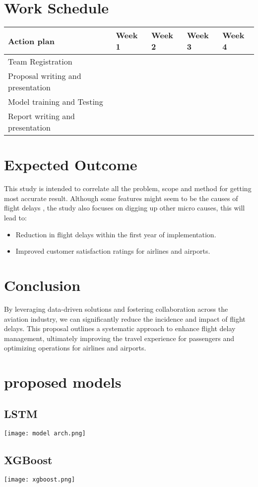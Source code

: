 \documentclass{article}
\begin{document}
\section{Work Schedule}
\begin{center}
  \begin{tabular}{|p{3cm}|p{1.5cm}|p{1.5cm}|p{1.5cm}|p{1.5cm}|}
    \hline
    \textbf{Action plan}& \textbf{Week 1} &\textbf{Week 2} &\textbf{Week 3}& \textbf{Week 4}\\[10pt]
    \hline
    Team Registration& \multicolumn{1}{c}{\cellcolor{gray}} & & & \\[10pt]
    \hline
    Proposal writing and presentation& & \multicolumn{1}{c}{\cellcolor{gray}}& &\\
    \hline
    Model training and Testing&  & & \multicolumn{1}{c}{\cellcolor{gray}}&\\
    \hline
    Report writing and presentation& & &&\multicolumn{1}{c}{\cellcolor{gray}}\\
    \hline
\end{tabular}  
\end{center}
\section{Expected Outcome}
This study is intended to correlate all the problem, scope and method for getting most accurate result. Although some features might seem to be the causes of flight delays \cite{yazdi2020flight}, the study also focuses on digging up other micro causes, this will lead to:
\begin{itemize}
    \item Reduction in flight delays within the first year of implementation.
    \item Improved customer satisfaction ratings for airlines and airports.
\end{itemize}
\section{Conclusion}
By leveraging data-driven solutions and fostering collaboration across the aviation industry, we can significantly reduce the incidence and impact of flight delays. This proposal outlines a systematic approach to enhance flight delay management, ultimately improving the travel experience for passengers and optimizing operations for airlines and airports.
\newpage


\newpage
\appendix
\section{proposed models}
\subsection{LSTM}
\vspace{1cm}
\begin{center}
    \texttt{[image: model arch.png]}
\end{center}
\vspace{1.5cm}
\subsection{XGBoost}
\vspace{1cm}
\begin{center}
    \texttt{[image: xgboost.png]}
\end{center}
\end{document}
